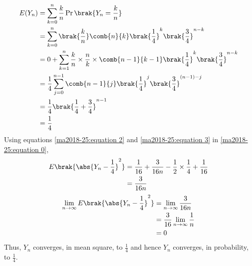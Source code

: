 \begin{align}
    E(Y_n) &= \sum_{k=0}^n\frac{k}{n}\Pr{\brak{Y_n=\frac{k}{n}}}
    \\&= \sum_{k=0}^{n} \brak{\frac{k}{n}}\comb{n}{k} \brak{\frac{1}{4}}^{k} \brak{\frac{3}{4}}^{n-k}
    \\&= 0 + \sum_{k=1}^{n} \frac{k}{n}\times\frac{n}{k}\times\comb{n-1}{k-1}\brak{\frac{1}{4}}^{k} \brak{\frac{3}{4}}^{n-k}
    \\&= \frac{1}{4}\sum_{j=0}^{n-1} \comb{n-1}{j}\brak{\frac{1}{4}}^{j} \brak{\frac{3}{4}}^{(n-1)-j}
    \\&= \frac{1}{4}\brak{\frac{1}{4} + \frac{3}{4}}^{n-1}
    \\&= \frac{1}{4} \label{ma2018-25:equation 3}
\end{align}
Using equations \eqref{ma2018-25:equation 2} and \eqref{ma2018-25:equation 3} in \eqref{ma2018-25:equation 0},
\begin{align}
    E\brak{\abs{Y_n-\frac{1}{4}}^2} &= \frac{1}{16}+ \frac{3}{16n}-\frac{1}{2}\times\frac{1}{4} + \frac{1}{16}
    \\&= \frac{3}{16n}
\end{align}
\begin{align}
    \lim_{n\rightarrow \infty} E\brak{\abs{Y_n-\frac{1}{4}}^2} &=  \lim_{n\rightarrow \infty}  \frac{3}{16n}
    \\&= \frac{3}{16}\lim_{n\rightarrow \infty}\frac{1}{n}
    \\&= 0
\end{align}
Thus, $Y_n$ converges, in mean square, to $\frac{1}{4}$ and hence $Y_n$ converges, in probability, to $\frac{1}{4}$.